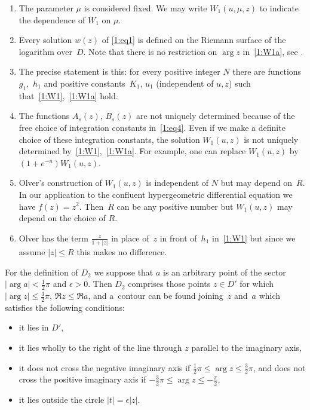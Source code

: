 \documentclass[pdftex]{sigma}
\numberwithin{equation}{section}
\begin{document}
\begin{Remarks}\quad
\begin{enumerate}\itemsep=0pt
\item
The parameter $\mu$ is considered f\/ixed. We may write $W_1(u,\mu,z)$ to indicate the dependence of $W_1$ on $\mu$.
\item
Every solution $w(z)$ of \eqref{1:eq1} is def\/ined on the Riemann surface of the logarithm over~$D$. Note that there is no restriction on $\arg z$ in~\eqref{1:W1a}, see \cite[p.~76]{O}.
\item
The precise statement is this: for every positive integer $N$ there are functions~$g_1$,~$h_1$ and positive constants~$K_1$, $u_1$ (independent of $u,z$)
such that~\eqref{1:W1},~\eqref{1:W1a} hold.
\item
The functions $A_s(z)$, $B_s(z)$ are not uniquely determined because of the free choice of
integration constants in~\eqref{1:eq4}. Even if we make a def\/inite choice of these integration constants, the solution $W_1(u,z)$
is not uniquely determined by~\eqref{1:W1},~\eqref{1:W1a}. For example, one can replace $W_1(u,z)$ by $(1+e^{-u})W_1(u,z)$.
\item
Olver's construction of $W_1(u,z)$ is independent of $N$ but may depend on~$R$.
In our application to the conf\/luent hypergeometric dif\/ferential equation we have $f(z)=z^2$. Then~$R$ can be any positive number
but $W_1(u,z)$ may depend on the choice of $R$.
\item
Olver has the term $\frac{z}{1+|z|}$ in place of~$z$ in front of~$h_1$ in~\eqref{1:W1} but since we assume $|z|\le R$ this makes no dif\/ference.
\end{enumerate}
\end{Remarks}

For the def\/inition of $D_2$ we suppose that $a$ is an arbitrary point of the sector $|\arg a|<\frac12\pi$ and $\epsilon>0$.
Then $D_2$ comprises those points $z\in D'$ for which $|\arg z|\le\frac32\pi$, $\Re z\le \Re a$, and a~contour can be found joining~$z$ and~$a$
which satisf\/ies the following conditions:
\begin{itemize}\itemsep=0pt
\item[(i)] it lies in $D'$,
\item[(ii)]
it lies wholly to the right of the line through $z$ parallel to the imaginary axis,
\item[(iii)]
it does not cross the negative imaginary axis if $\frac12\pi\le \arg z\le \frac32\pi$, and does not cross
the positive imaginary axis if $-\frac32\pi\le \arg z\le -\frac\pi2$,
\item[(iv)]
it lies outside the circle $|t|=\epsilon |z|$.
\end{itemize}
\end{document}
